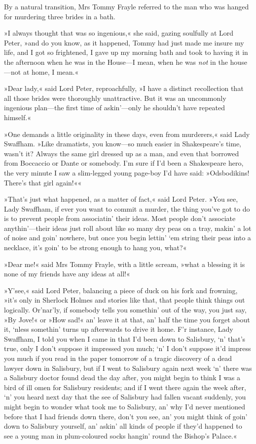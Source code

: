 By a natural transition, Mrs Tommy Frayle referred to the man who was hanged for murdering three brides in a bath.

»I always thought that was so ingenious,« she said, gazing soulfully at Lord Peter, »and do you know, as it happened, Tommy had just made me insure my life, and I got so frightened, I gave up my morning bath and took to having it in the afternoon when he was in the House—I mean, when he was \textit{not} in the house—not at home, I mean.«

»Dear lady,« said Lord Peter, reproachfully, »I have a distinct recollection that all those brides were thoroughly unattractive. But it was an uncommonly ingenious plan—the first time of askin'---only he shouldn't have repeated himself.«

»One demands a little originality in these days, even from murderers,« said Lady Swaffham. »Like dramatists, you know—so much easier in Shakespeare's time, wasn't it? Always the same girl dressed up as a man, and even that borrowed from Boccaccio or Dante or somebody. I'm sure if I'd been a Shakespeare hero, the very minute I saw a slim-legged young page-boy I'd have said: »Odsbodikins! There's that girl again!««

»That's just what happened, as a matter of fact,« said Lord Peter. »You see, Lady Swaffham, if ever you want to commit a murder, the thing you've got to do is to prevent people from associatin' their ideas. Most people don't associate anythin'---their ideas just roll about like so many dry peas on a tray, makin' a lot of noise and goin' nowhere, but once you begin lettin' `em string their peas into a necklace, it's goin' to be strong enough to hang you, what?«

»Dear me!« said Mrs Tommy Frayle, with a little scream, »what a blessing it is none of my friends have any ideas at all!«

»Y'see,« said Lord Peter, balancing a piece of duck on his fork and frowning, »it's only in Sherlock Holmes and stories like that, that people think things out logically. Or'nar'ly, if somebody tells you somethin' out of the way, you just say, »By Jove!« or »How sad!« an' leave it at that, an' half the time you forget about it, `nless somethin' turns up afterwards to drive it home. F'r instance, Lady Swaffham, I told you when I came in that I'd been down to Salisbury, `n' that's true, only I don't suppose it impressed you much; `n' I don't suppose it'd impress you much if you read in the paper tomorrow of a tragic discovery of a dead lawyer down in Salisbury, but if I went to Salisbury again next week `n' there was a Salisbury doctor found dead the day after, you might begin to think I was a bird of ill omen for Salisbury residents; and if I went there again the week after, `n' you heard next day that the see of Salisbury had fallen vacant suddenly, you might begin to wonder what took me to Salisbury, an' why I'd never mentioned before that I had friends down there, don't you see, an' you might think of goin' down to Salisbury yourself, an' askin' all kinds of people if they'd happened to see a young man in plum-coloured socks hangin' round the Bishop's Palace.«

